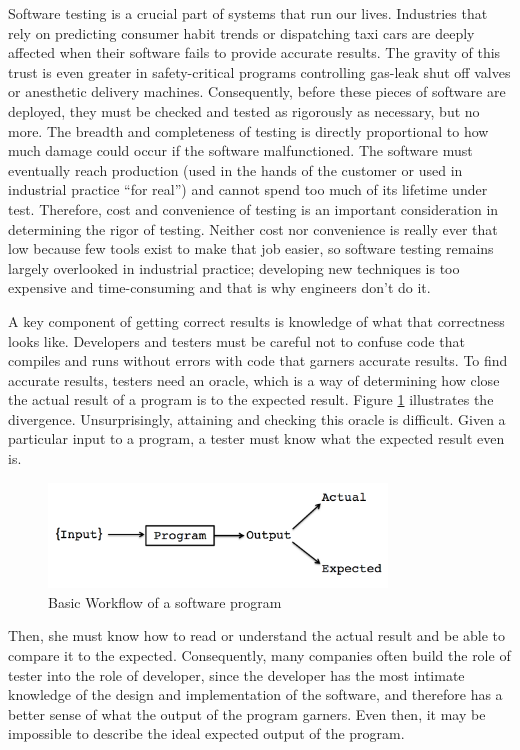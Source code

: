 
Software testing is a crucial part of systems that run our lives. Industries that rely on predicting consumer habit trends or dispatching taxi cars are deeply affected when their software fails to provide accurate results. The gravity of this trust is even greater in safety-critical programs controlling gas-leak shut off valves or anesthetic delivery machines. Consequently, before these pieces of software are deployed, they must be checked and tested as rigorously as necessary, but no more. The breadth and completeness of testing is directly proportional to how much damage could occur if the software malfunctioned. The software must eventually reach production (used in the hands of the customer or used in industrial practice ``for real'') and cannot spend too much of its lifetime under test. Therefore, cost and convenience of testing is an important consideration in determining the rigor of testing. Neither cost nor convenience is really ever that low because few tools exist to make that job easier, so software testing remains largely overlooked in industrial practice; developing new techniques is too expensive and time-consuming and that is why engineers don't do it. 

A key component of getting correct results is knowledge of what that correctness looks like. Developers and testers must be careful not to confuse code that compiles and runs without errors with code that garners accurate results. To find accurate results, testers need an oracle, which is a way of determining how close the actual result of a program is to the expected result. Figure \ref{fig:workflow} illustrates the divergence. Unsurprisingly, attaining and checking this oracle is difficult. Given a particular input to a program, a tester must know what the expected result even is. 
\begin{figure}
\centering
\includegraphics[width=90mm,scale=0.5]{diagram.png}
\caption{Basic Workflow of a software program}
\label{fig:workflow}
\end{figure}
Then, she must know how to read or understand the actual result and be able to compare it to the expected. Consequently, many companies often build the role of tester into the role of developer, since the developer has the most intimate knowledge of the design and implementation of the software, and therefore has a better sense of what the output of the program garners. Even then, it may be impossible to describe the ideal expected output of the program.


